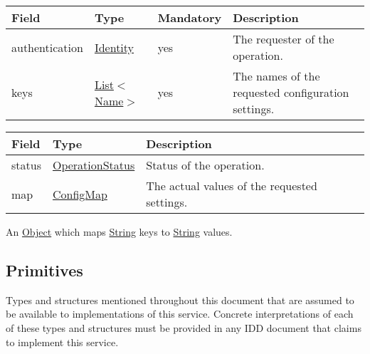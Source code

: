 \documentclass[a4paper]{arrowhead}
\newcommand{\pref}[1]{{\textcolor{ArrowheadGrey}{\hyperref[sec:model:primitives:#1]{#1}}}}
\begin{document}
 
\begin{table}[ht!]
\begin{tabularx}{\textwidth}{| p{2.5cm} | p{2.5cm} | p{2cm} | X |} \hline
\rowcolor{gray!33} Field & Type & Mandatory & Description \\ \hline
authentication & \hyperref[sec:model:Identity]{Identity} & yes & The requester of the operation. \\ \hline
keys & \pref{List}$<$\pref{Name}$>$ & yes & The names of the requested configuration settings. \\ \hline
\end{tabularx}
\end{table}


\begin{table}[ht!]
\begin{tabularx}{\textwidth}{| p{2.5cm} | p{2.5cm} | X |} \hline
\rowcolor{gray!33} Field & Type      & Description \\ \hline
status & \pref{OperationStatus} & Status of the operation. \\ \hline
map & \hyperref[sec:model:ConfigMap]{ConfigMap} & The actual values of the requested settings. \\ \hline
\end{tabularx}
\end{table}


An \pref{Object} which maps \pref{String} keys to \pref{String} values.

\clearpage

\subsection{Primitives}
\label{sec:model:primitives}

Types and structures mentioned throughout this document that are assumed to be available to implementations of this service.
Concrete interpretations of each of these types and structures must be provided in any IDD document that claims to implement this service.
\end{document}
